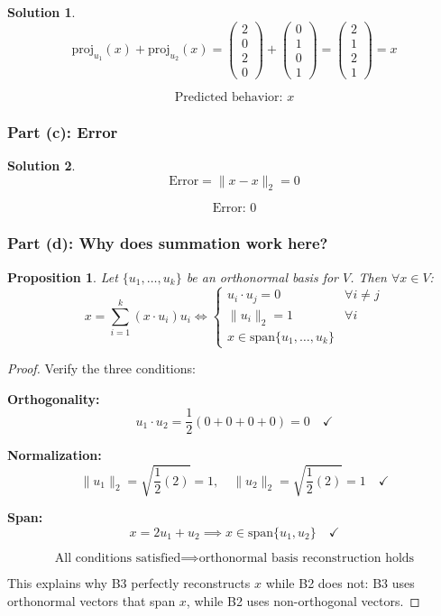 \documentclass[12pt]{article}
\newtheorem{proposition}{Proposition}
\theoremstyle{definition}
\newtheorem{solution}{Solution}
\begin{document}
\begin{solution}
\[
\text{proj}_{u_1}(x) + \text{proj}_{u_2}(x) = \begin{pmatrix} 2 \\ 0 \\ 2 \\ 0 \end{pmatrix} + \begin{pmatrix} 0 \\ 1 \\ 0 \\ 1 \end{pmatrix} = \begin{pmatrix} 2 \\ 1 \\ 2 \\ 1 \end{pmatrix} = x
\]

\[
\boxed{\text{Predicted behavior: } x}
\]
\end{solution}

\subsubsection*{Part (c): Error}

\begin{solution}
\[
\text{Error} = \|x - x\|_2 = 0
\]

\[
\boxed{\text{Error: } 0}
\]
\end{solution}

\subsubsection*{Part (d): Why does summation work here?}

\begin{proposition}
Let $\{u_1, \ldots, u_k\}$ be an orthonormal basis for $V$. Then $\forall x \in V$:
\[
x = \sum_{i=1}^k (x \cdot u_i) u_i \iff \begin{cases}
u_i \cdot u_j = 0 & \forall i \neq j \\
\|u_i\|_2 = 1 & \forall i \\
x \in \text{span}\{u_1, \ldots, u_k\}
\end{cases}
\]
\end{proposition}

\begin{proof}
Verify the three conditions:

\textbf{Orthogonality:}
\[
u_1 \cdot u_2 = \frac{1}{2}(0 + 0 + 0 + 0) = 0 \quad \checkmark
\]

\textbf{Normalization:}
\[
\|u_1\|_2 = \sqrt{\frac{1}{2}(2)} = 1, \quad \|u_2\|_2 = \sqrt{\frac{1}{2}(2)} = 1 \quad \checkmark
\]

\textbf{Span:}
\[
x = 2u_1 + u_2 \implies x \in \text{span}\{u_1, u_2\} \quad \checkmark
\]

\[
\boxed{\text{All conditions satisfied} \implies \text{orthonormal basis reconstruction holds}}
\]

This explains why B3 perfectly reconstructs $x$ while B2 does not: B3 uses orthonormal vectors that span $x$, while B2 uses non-orthogonal vectors.
\end{proof}
\end{document}
